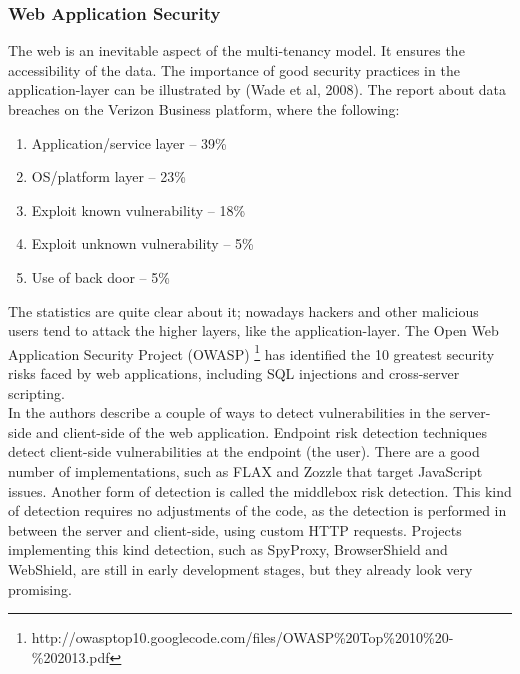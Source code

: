{{\subsubsection{Web Application Security}
The web is an inevitable aspect of the multi-tenancy model. It ensures the accessibility of the data. The importance of good security practices in the application-layer can be illustrated by (Wade et al, 2008). The report about data breaches on the Verizon Business platform, where the following:\\
\begin{enumerate}
    \item Application/service layer – 39\%
    \item OS/platform layer – 23\%
    \item Exploit known vulnerability – 18\%
    \item Exploit unknown vulnerability – 5\%
    \item Use of back door – 5\%
\end{enumerate}
The statistics are quite clear about it; nowadays hackers and other malicious users tend to attack the higher layers, like the application-layer. The Open Web Application Security Project (OWASP) \footnote{http://owasptop10.googlecode.com/files/OWASP\%20Top\%2010\%20-\%202013.pdf} has identified the 10 greatest security risks faced by web applications, including SQL injections and cross-server scripting. \\
In \cite{Takahashi2012Security} the authors describe a couple of ways to detect vulnerabilities in the server-side and client-side of the web application. Endpoint risk detection techniques detect client-side vulnerabilities at the endpoint (the user). There are a good number of implementations, such as FLAX and Zozzle that target JavaScript issues. Another form of detection is called the middlebox risk detection. This kind of detection requires no adjustments of the code, as the detection is performed in between the server and client-side, using custom HTTP requests. Projects implementing this kind detection, such as SpyProxy, BrowserShield and WebShield, are still in early development stages, but they already look very promising.\\

}}

